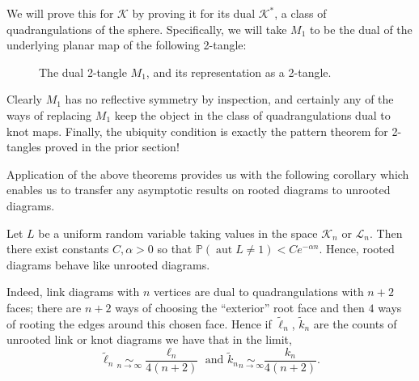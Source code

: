 \documentclass[amsmath,longbibliography,secnumarabic,floatfix,amssymb,nofootinbib,nobibnotes,letterpaper,11pt,notitlepage,preprint]{revtex4-1}
\newcommand{\KnotDia}{\mathcal{K}}
\newcommand{\FlatKnotDia}{\mathscr{K}}
\newcommand{\LinkDia}{\mathcal{L}}
\newcommand{\Prb}{\mathbb{P}}
\DeclareMathOperator{\Aut}{aut}
\begin{document}
We will prove this for $\FlatKnotDia$ by proving it for its dual $\FlatKnotDia^*$, a class of
quadrangulations of the sphere. Specifically, we will take $M_1$ to be the dual of the underlying
planar map of the following 2-tangle:
\begin{figure}[h!]
  \centering
  \caption{The dual 2-tangle $M_1$, and its representation as a 2-tangle.}
  \label{fig:treflegs2}
\end{figure}
Clearly $M_1$ has no reflective symmetry by inspection, and certainly any of the ways of replacing
$M_1$ keep the object in the class of quadrangulations dual to knot maps. Finally, the ubiquity
condition is exactly the pattern theorem for 2-tangles proved in the prior section!

Application of the above theorems provides us with the following corollary which enables us to
transfer any asymptotic results on rooted diagrams to unrooted diagrams.

\begin{corollary}
  Let $L$ be a uniform random variable taking values in the space $\KnotDia_n$ or $\LinkDia_n$. Then
  there exist constants $C, \alpha > 0$ so that $\Prb(\Aut L \ne 1) < Ce^{-\alpha n}$. Hence, rooted
  diagrams behave like unrooted diagrams.
\end{corollary}

Indeed, link diagrams with $n$ vertices are dual to quadrangulations with $n+2$ faces; there are
$n+2$ ways of choosing the ``exterior'' root face and then $4$ ways of rooting the edges around this
chosen face. Hence if $\tilde \ell_n$, $\tilde k_n$ are the counts of unrooted link or knot diagrams
we have that in the limit,
\[ \tilde\ell_n \underset{n\to\infty}{\sim} \frac{\ell_n}{4(n+2)} \text{ and } \tilde k_n
\underset{n\to\infty}{\sim} \frac{k_n}{4(n+2)}.\]
\end{document}
